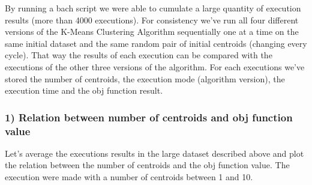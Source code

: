\documentclass[11pt]{article}
\begin{document}
By running a bach script we were able to cumulate a large quantity of
execution results (more than 4000 executions). For consistency we've run
all four different versions of the K-Means Clustering Algorithm
sequentially one at a time on the same initial dataset and the same
random pair of initial centroids (changing every cycle). That way the
results of each execution can be compared with the executions of the
other three versions of the algorithm. For each executions we've stored
the number of centroids, the execution mode (algorithm version), the
execution time and the obj function result.

\hypertarget{relation-between-number-of-centroids-and-obj-function-value}{%
\subsubsection{1) Relation between number of centroids and obj function
value}\label{relation-between-number-of-centroids-and-obj-function-value}}

Let's average the executions results in the large dataset described
above and plot the relation between the number of centroids and the obj
function value. The execution were made with a number of centroids
between 1 and 10.
\end{document}
